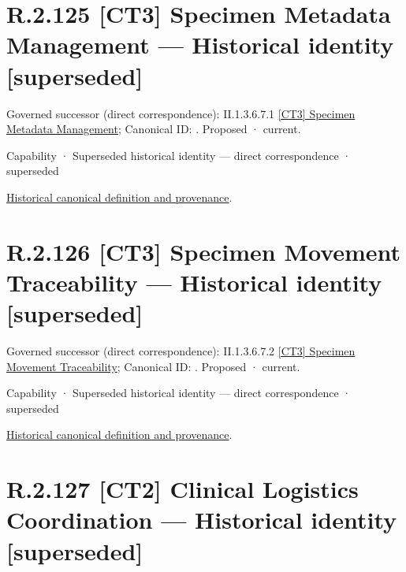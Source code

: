 \section*{R.2.125 [CT3] Specimen Metadata Management — Historical identity [superseded]}
\label{navigation:R.2.125}

{\small Governed successor (direct correspondence): II.1.3.6.7.1 \hyperref[element:738736425b7446fdae47b06c91c4f69c]{[CT3] Specimen Metadata Management}; Canonical ID: \texttt{}. Proposed · current.}\par
\label{element:3b000d3712534d16a48470f79df8e33a}
{\small Capability · Superseded historical identity — direct correspondence · superseded}\par
\href{../../../../continuum/strategy/capability/3b000d3712534d16a48470f79df8e33a.md}{Historical canonical definition and provenance}.\par
\section*{R.2.126 [CT3] Specimen Movement Traceability — Historical identity [superseded]}
\label{navigation:R.2.126}

{\small Governed successor (direct correspondence): II.1.3.6.7.2 \hyperref[element:bfa2e9a84ddd4287897573dc0d917a00]{[CT3] Specimen Movement Traceability}; Canonical ID: \texttt{}. Proposed · current.}\par
\label{element:129119d7b2744ffd805c58f25557fa27}
{\small Capability · Superseded historical identity — direct correspondence · superseded}\par
\href{../../../../continuum/strategy/capability/129119d7b2744ffd805c58f25557fa27.md}{Historical canonical definition and provenance}.\par
\section*{R.2.127 [CT2] Clinical Logistics Coordination — Historical identity [superseded]}
\label{navigation:R.2.127}

